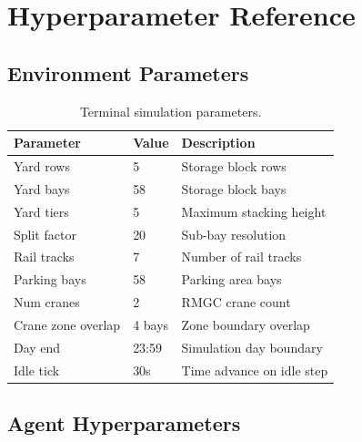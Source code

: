 \chapter{Hyperparameter Reference}
\label{app:hyperparameters}

\section{Environment Parameters}
\label{app:hyper:env}

\begin{table}[H]
\centering
\caption{Terminal simulation parameters.}
\label{tab:hyper:env}
\begin{tabular}{l l l}
\toprule
\textbf{Parameter} & \textbf{Value} & \textbf{Description} \\
\midrule
Yard rows           & 5      & Storage block rows \\
Yard bays           & 58     & Storage block bays \\
Yard tiers          & 5      & Maximum stacking height \\
Split factor        & 20     & Sub-bay resolution \\
Rail tracks         & 7      & Number of rail tracks \\
Parking bays        & 58     & Parking area bays \\
Num cranes          & 2      & RMGC crane count \\
Crane zone overlap  & 4 bays & Zone boundary overlap \\
Day end             & 23:59  & Simulation day boundary \\
Idle tick           & 30s    & Time advance on idle step \\
\bottomrule
\end{tabular}
\end{table}

\section{Agent Hyperparameters}
\label{app:hyper:agent}

